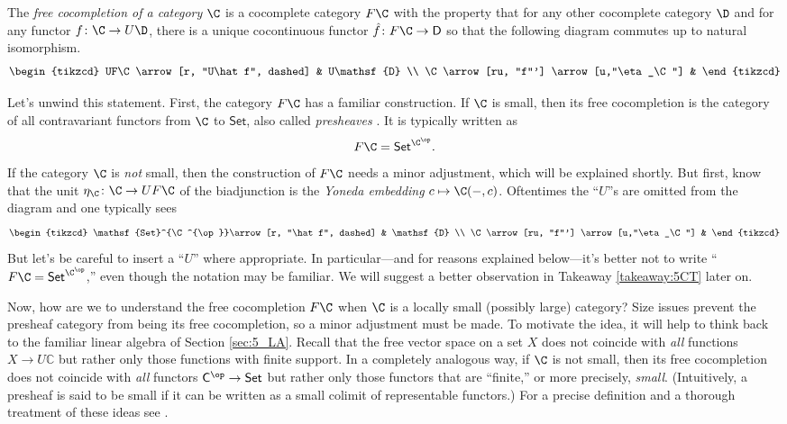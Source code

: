 \begin{UP_cocomplete}The \textit{free cocompletion of a category $\C$} is a cocomplete category $F\C$ with the property that for any other cocomplete category $\D$ and for any functor $f\colon \C\to U\D$, there is a unique cocontinuous functor $\hat f\colon F\C \to \mathsf{D}$ so that the following diagram commutes up to natural isomorphism.
\[
  \begin{tikzcd}
  UF\C \arrow[r, "U\hat f", dashed] & U\mathsf{D} \\
  \C \arrow[ru, "f"'] \arrow[u,"\eta_\C"]                 &   
  \end{tikzcd}
\]
\end{UP_cocomplete}
Let's unwind this statement. First, the category $F\C$ has a familiar construction. If $\C$ is small, then its free cocompletion is the category of all contravariant functors from $\C$ to $\mathsf{Set}$, also called \emph{presheaves} \cite{Day_2007}. It is typically written as
\[F\C=\mathsf{Set}^{\C^{\op}}.\]
If the category $\C$ is \textit{not} small, then the construction of $F\C$ needs a minor adjustment, which will be explained shortly. But first, know that the unit $\eta_\C\colon \C\to UF\C$ of the biadjunction is the \emph{Yoneda embedding} $c\mapsto \C(-,c)$. Oftentimes the ``$U$''s are omitted from the diagram and one typically sees
\[
  \begin{tikzcd}
  \mathsf{Set}^{\C^{\op}}\arrow[r, "\hat f", dashed] & \mathsf{D} \\
  \C \arrow[ru, "f"'] \arrow[u,"\eta_\C"]                 &   
  \end{tikzcd}
\]
But let's be careful to insert a ``$U$'' where appropriate. In particular---and for reasons explained below---it's better not to write ``$F\C=\mathsf{Set}^{\C^{\op}}$,'' even though the notation may be familiar. We will suggest a better observation in Takeaway \ref{takeaway:5CT} later on. 

Now, how are we to understand the free cocompletion $F\C$ when $\C$ is a locally small (possibly large) category? Size issues prevent the presheaf category from being its free cocompletion, so a minor adjustment must be made. To motivate the idea, it will help to think back to the familiar linear algebra of Section \ref{sec:5_LA}. Recall that the free vector space on a set $X$ does not coincide with \textit{all} functions $X\to U\mathbb{C}$ but rather only those functions with finite support. In a completely analogous way, if $\C$ is not small, then its free cocompletion does not coincide with \textit{all} functors $\mathsf{C}^{\op}\to\mathsf{Set}$ but rather only those functors that are ``finite,'' or more precisely, \emph{small}. (Intuitively, a presheaf is said to be small if it can be written as a small colimit of representable functors.) For a precise definition and a thorough treatment of these ideas see \cite{Day_2007}.

